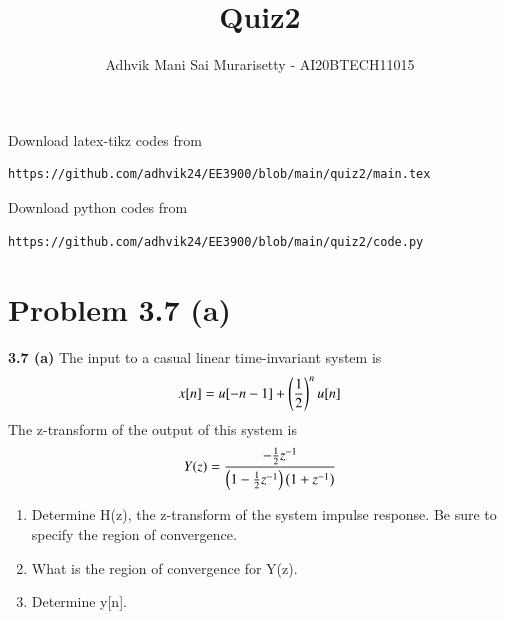 \documentclass[journal,12pt,twocolumn]{IEEEtran}
\begin{document}
\vspace{3cm}
\title{Quiz2}
\author{Adhvik Mani Sai Murarisetty - AI20BTECH11015}
\maketitle
\newpage
\bigskip
\renewcommand{\thetable}{\theenumi}

Download latex-tikz codes from 
%
\begin{lstlisting}
https://github.com/adhvik24/EE3900/blob/main/quiz2/main.tex
\end{lstlisting}
%
Download python codes from 
%
\begin{lstlisting}
https://github.com/adhvik24/EE3900/blob/main/quiz2/code.py
\end{lstlisting}
\section*{Problem 3.7 (a)}
\textbf{3.7 (a)}  The input to a casual linear time-invariant system is
\begin{align}
    x[n]=u[-n-1]+\left(\frac{1}{2}\right)^n u[n]
\end{align}
The z-transform of the output of this system is
\begin{align}
    Y(z)=\frac{-\frac{1}{2}z^{-1}}{\left(1-\frac{1}{2}z^{-1}\right)\left(1+z^{-1}\right)}
\end{align}
\begin{enumerate}[label=(\alph*)]
    \item Determine H(z), the z-transform of the system impulse response. Be sure to specify the region of convergence.
    \item What is the region of convergence for Y(z).
    \item Determine y[n].
\end{enumerate}
\end{document}
